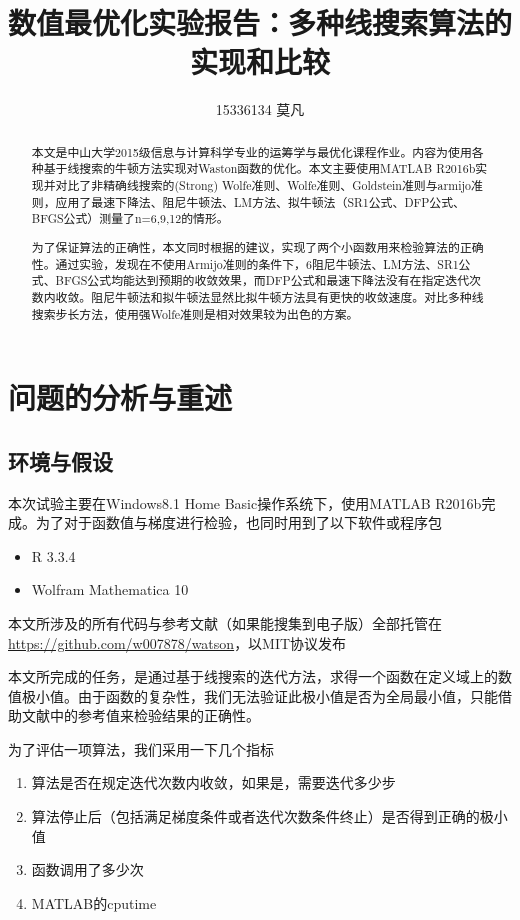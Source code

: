 \documentclass[11pt, a4paper]{article}
\begin{document}
\title{数值最优化实验报告：多种线搜索算法的实现和比较}
\author{15336134 莫凡}
\maketitle
\vspace{50pt}
\begin{abstract}
	本文是中山大学2015级信息与计算科学专业的运筹学与最优化课程作业\cite{高立2014数}。内容为使用各种基于线搜索的牛顿方法实现对Waston函数\cite{More:1981:TUO:355934.355936}的优化。本文主要使用MATLAB R2016b实现并对比了非精确线搜索的(Strong) Wolfe准则、Wolfe准则、Goldstein准则与armijo准则，应用了最速下降法、阻尼牛顿法、LM方法、拟牛顿法（SR1公式、DFP公式、BFGS公式）测量了n=6,9,12的情形。
	
	为了保证算法的正确性，本文同时根据\cite{More:1981:TUO:355934.355936}的建议，实现了两个小函数用来检验算法的正确性。通过实验，发现在不使用Armijo准则的条件下，6阻尼牛顿法、LM方法、SR1公式、BFGS公式均能达到预期的收敛效果，而DFP公式和最速下降法没有在指定迭代次数内收敛。阻尼牛顿法和拟牛顿法显然比拟牛顿方法具有更快的收敛速度。对比多种线搜索步长方法，使用强Wolfe准则是相对效果较为出色的方案。
\end{abstract}
\newpage
\tableofcontents
\newpage

\section{问题的分析与重述}

\subsection{环境与假设}
本次试验主要在Windows8.1 Home Basic操作系统下，使用MATLAB R2016b完成。为了对于函数值与梯度进行检验，也同时用到了以下软件或程序包
\begin{itemize}
	\item R 3.3.4
	\item Wolfram Mathematica 10
\end{itemize}

本文所涉及的所有代码与参考文献（如果能搜集到电子版）全部托管在 \url{https://github.com/w007878/watson}，以MIT协议发布

本文所完成的任务，是通过基于线搜索的迭代方法，求得一个函数在定义域上的数值极小值。由于函数的复杂性，我们无法验证此极小值是否为全局最小值，只能借助文献\cite{More:1981:TUO:355934.355936}中的参考值来检验结果的正确性。

为了评估一项算法，我们采用一下几个指标
\begin{enumerate}
	\item 算法是否在规定迭代次数内收敛，如果是，需要迭代多少步
	\item 算法停止后（包括满足梯度条件或者迭代次数条件终止）是否得到正确的极小值
	\item 函数调用了多少次
	\item MATLAB的cputime
\end{enumerate}
\end{document}
